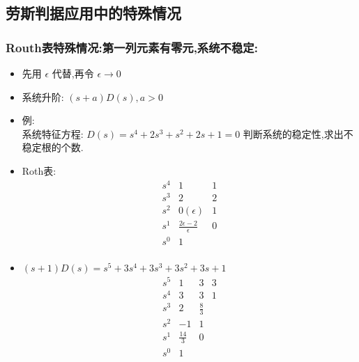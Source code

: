 \documentclass{article}
\begin{document}
\subsection{劳斯判据应用中的特殊情况}
\label{sec-2-4}
\begin{frame}
\frametitle{Routh表特殊情况:第一列元素有零元,系统不稳定:}
\label{sec-2-4-1}

\begin{itemize}
\item 先用 $\epsilon$ 代替,再令 $\epsilon\rightarrow 0$
\item 系统升阶: $(s+a)D(s),a>0$
\end{itemize}
\begin{itemize}

\item 例:\\
\label{sec-2-4-1-1}%
系统特征方程: $D(s)=s^{4}+2s^{3}+s^{2}+2s+1=0$ 判断系统的稳定性,求出不稳定根的个数.


\item Roth表:\\
\label{sec-2-4-1-2}%
\[
\begin{matrix}
s^{4}   &  1  &   1  \\
s^{3}   &  2  &  2   \\
s^{2}   &  0(\epsilon)  &  1   \\
s^{1}   &  \frac{2\epsilon-2}{\epsilon} & 0 \\
s^{0}   &  1   \\
\end{matrix}
\]


\item $(s+1)D(s)=s^{5}+3s^{4}+3s^{3}+3s^{2}+3s+1$\\
\label{sec-2-4-1-3}%
\[
\begin{matrix}
s^{5} & 1 & 3 & 3 \\
s^{4} & 3 & 3 & 1 \\
s^{3} & 2 & \frac{8}{3} \\
s^{2} & -1 & 1 \\
s^{1} & \frac{14}{3} & 0 \\
s^{0} & 1
\end{matrix}
\]

\end{itemize} %
\end{frame}
\end{document}
